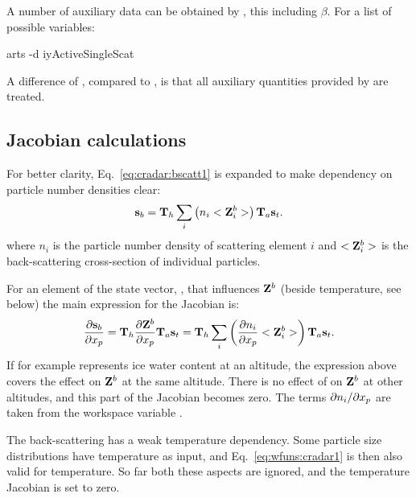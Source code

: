 A number of auxiliary data can be obtained by , this
including $\beta$. For a list of possible variables:
\begin{code}
arts -d iyActiveSingleScat
\end{code}
A difference of , compared to , is
that all auxiliary quantities provided by  are
treated.



\subsection{Jacobian calculations}
\label{sec:cradar:jac}

For better clarity, Eq.~\ref{eq:cradar:bscatt1} is expanded to make dependency
on particle number densities clear:
\begin{equation}
  {\bf s}_{b} = {\bf T}_{h}\sum_i\left(n_i<{\bf Z}^b_i>\right){\bf T}_{a}{\bf s}_{t}.
\end{equation}
where $n_i$ is the particle number density of scattering element $i$ and
$<{\bf Z}^b_i>$ is the back-scattering cross-section of individual particles.

For an element of the state vector, , that influences ${\bf Z}^b$
(beside temperature, see below) the main expression for the Jacobian is:
\begin{equation}
  \frac{\partial{\bf s}_{b}}{\partial x_{p}} = {\bf T}_{h}
    \frac{\partial{\bf Z}^b}{\partial x_{p}}{\bf T}_{a}{\bf s}_{t} = 
    {\bf T}_{h} \sum_i\left(\frac{\partial n_i}{\partial x_{p}}<{\bf Z}^b_i>\right)
    {\bf T}_{a}{\bf s}_{t}.
  \label{eq:wfuns:cradar1}
\end{equation}
If for example  represents ice water content at an altitude, the
expression above covers the effect on ${\bf Z}^b$ at the same altitude. There
is no effect of  on ${\bf Z}^b$ at other altitudes, and this part of
the Jacobian becomes zero. The terms $\partial n_i/\partial x_{p}$ are
taken from the workspace variable .

The back-scattering has a weak temperature dependency. Some particle size
distributions have temperature as input, and Eq.~\ref{eq:wfuns:cradar1} is then
also valid for temperature. So far both these aspects are ignored, and the
temperature Jacobian is set to zero.

